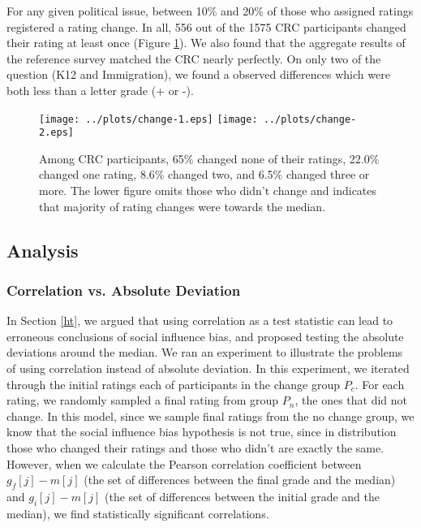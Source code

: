 For any given political issue, between 10\% and 20\% of those who assigned ratings registered a rating change.
In all, 556 out of the 1575 CRC participants changed their rating at least once (Figure \ref{change-1}).
We also found that the aggregate results of the reference survey matched the CRC nearly perfectly.
On only two of the question (K12 and Immigration), we found a observed differences which were both less than a letter grade (+ or -).

\begin{figure}[h]
\hspace*{-2em}
    \texttt{[image: ../plots/change-1.eps]}
    \hspace*{-2em}
    \texttt{[image: ../plots/change-2.eps]}
      \caption{Among CRC participants, 65\% changed none of their ratings, 22.0\% changed one rating, 8.6\% changed two, and 6.5\% changed three or more. The lower figure omits those who didn't change and indicates that majority of rating changes were towards the median.}
      \label{change-1}
      \vspace{2em}
\end{figure}

\subsection{Analysis}

\subsubsection{Correlation vs. Absolute Deviation}
\label{exp-robust}
In Section \ref{ht}, we argued that using correlation as a test statistic can lead to erroneous conclusions of social influence bias, and proposed testing the absolute deviations around the median.
We ran an experiment to illustrate the problems of using correlation instead of absolute deviation.
In this experiment, we iterated through the initial ratings each of participants in the change group $P_c$.
For each rating, we randomly sampled a final rating from group $P_n$, the ones that did not change.
In this model, since we sample final ratings from the no change group, we know that the social influence bias hypothesis is not true, since in distribution those who changed their ratings and those who didn't are exactly the same.
However, when we calculate the Pearson correlation coefficient between $g_f[j] - m[j]$ (the set of differences between the final grade and the median) and $g_i[j] - m[j]$ (the set of differences between the initial grade and the median), we find statistically significant correlations.

